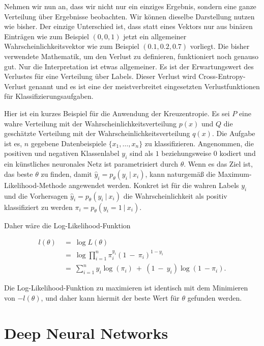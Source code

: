 Nehmen wir nun an, dass wir nicht nur ein einziges Ergebnis, sondern eine ganze Verteilung über Ergebnisse beobachten. Wir können dieselbe Darstellung nutzen wie bisher. Der einzige Unterschied ist, dass statt eines Vektors nur aus binären Einträgen wie zum Beispiel $(0, 0, 1)$ jetzt ein allgemeiner Wahrscheinlichkeitsvektor wie zum Beispiel $(0.1, 0.2, 0.7)$ vorliegt. Die bisher verwendete Mathematik, um den Verlust zu definieren, funktioniert noch genauso gut. Nur die Interpretation ist etwas allgemeiner. Es ist der Erwartungswert des Verlustes für eine Verteilung über Labels. Dieser Verlust wird Cross-Entropy-Verlust genannt und es ist eine der meistverbreitet eingesetzten Verlustfunktionen für Klassifizierungsaufgaben.

Hier ist ein kurzes Beispiel für die Anwendung der Kreuzentropie. Es sei $P$ eine wahre Verteilung mit der Wahrscheinlichkeitsverteilung $p(x)$ und $Q$ die geschätzte Verteilung mit der Wahrscheinlichkeitsverteilung $q(x)$. Die Aufgabe ist es, $n$ gegebene Datenbeispiele $\{x_{1}, \dots, x_{n}\}$ zu klassifizieren. Angenommen, die positiven und negativen Klassenlabel $y_{i}$ sind als $1$ beziehungsweise $0$ kodiert und ein künstliches neuronales Netz ist parametrisiert durch $\theta$. Wenn es das Ziel ist, das beste $\theta$ zu finden, damit $\hat{y}_{i} = p_{\theta}(y_{i}\ |\ x_{i})$, kann naturgemäß die Maximum-Likelihood-Methode angewendet werden. Konkret ist für die wahren Labels $y_{i}$ und die Vorhersagen $\hat{y}_{i} = p_{\theta}(y_{i}\ |\ x_{i})$ die Wahrscheinlichkeit als positiv klassifiziert zu werden $\pi_{i} = p_{\theta}(y_{i} = 1\ |\ x_{i})$.

Daher wäre die Log-Likelihood-Funktion

\begin{align}
  l(\theta)\ &=\ \log L(\theta) \\
  &=\ \log\prod_{i=1}^{n}\pi_{i}^{y_{i}} (1\ -\ \pi_{i})^{1-y_{i}} \tag*{}\\
  &=\ \sum_{i=1}^{n}y_{i}\log(\pi_{i})\ +\ (1\ -\ y_{i})\log(1\ - \pi_{i}). \tag*{}
\end{align}

Die Log-Likelihood-Funktion zu maximieren ist identisch mit dem Minimieren von $-l(\theta)$, und daher kann hiermit der beste Wert für $\theta$ gefunden werden.
\cite{zhang2020dive}

\section{Deep Neural Networks}
\label{sec:dnn}

